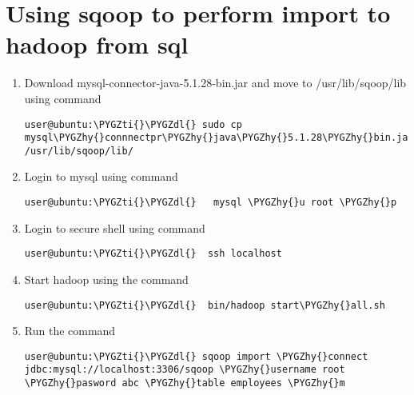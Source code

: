 \documentclass[letterpaper,10pt,english]{sphinxmanual}
\def\PYGZdl{\char`\$}
\def\PYGZhy{\char`\-}
\def\PYGZti{\char`\~}
\begin{document}
\section{Using sqoop to perform import to hadoop from sql}
\label{importdata:using-sqoop-to-perform-import-to-hadoop-from-sql}\begin{enumerate}
\item {} 
Download mysql-connector-java-5.1.28-bin.jar and move to /usr/lib/sqoop/lib using command

\begin{Verbatim}[commandchars=\\\{\}]
user@ubuntu:\PYGZti{}\PYGZdl{} sudo cp mysql\PYGZhy{}connnectpr\PYGZhy{}java\PYGZhy{}5.1.28\PYGZhy{}bin.jar /usr/lib/sqoop/lib/
\end{Verbatim}

\item {} 
Login to mysql using command

\begin{Verbatim}[commandchars=\\\{\}]
user@ubuntu:\PYGZti{}\PYGZdl{}   mysql \PYGZhy{}u root \PYGZhy{}p
\end{Verbatim}

\item {} 
Login to secure shell using command

\begin{Verbatim}[commandchars=\\\{\}]
user@ubuntu:\PYGZti{}\PYGZdl{}  ssh localhost
\end{Verbatim}

\item {} 
Start hadoop using the command

\begin{Verbatim}[commandchars=\\\{\}]
user@ubuntu:\PYGZti{}\PYGZdl{}  bin/hadoop start\PYGZhy{}all.sh
\end{Verbatim}

\item {} 
Run the command

\begin{Verbatim}[commandchars=\\\{\}]
user@ubuntu:\PYGZti{}\PYGZdl{} sqoop import \PYGZhy{}connect jdbc:mysql://localhost:3306/sqoop \PYGZhy{}username root \PYGZhy{}pasword abc \PYGZhy{}table employees \PYGZhy{}m
\end{Verbatim}

\end{enumerate}
\end{document}
